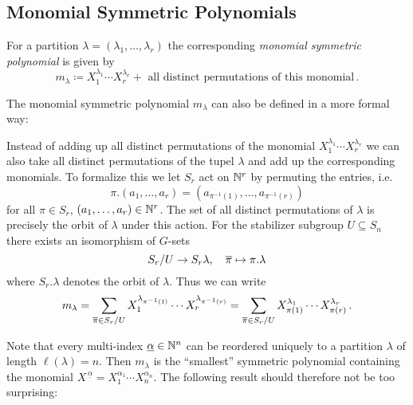 \subsection{Monomial Symmetric Polynomials}

\begin{definition}
  For a partition $\lambda = (\lambda_1, \dotsc, \lambda_r)$ the corresponding \emph{monomial symmetric polynomial} is given by
  \[
              m_\lambda
    \coloneqq   X_1^{\lambda_1} \dotsm X_r^{\lambda_r}
              + \text{ all distinct permutations of this monomial} \,.
  \]
\end{definition}


\begin{remark}
  The monomial symmetric polynomial $m_\lambda$ can also be defined in a more formal way:
  
  Instead of adding up all distinct permutations of the monomial $X_1^{\lambda_1} \dotsm X_r^{\lambda_r}$ we can also take all distinct permutations of the tupel $\lambda$ and add up the corresponding monomials.
  To formalize this we let $S_r$ act on $\mathbb{N}^r$ by permuting the entries, i.e.\
  \[
      \pi.(a_1, \dotsc, a_r)
    = ( a_{\pi^{-1}(1)}, \dotsc, a_{\pi^{-1}(r)} )
  \]
  for all $\pi \in S_r$, $(a_1, \dotsc, a_r) \in \mathbb{N}^r$.
  The set of all distinct permutations of $\lambda$ is precisely the orbit of $\lambda$ under this action.
  For the stabilizer subgroup $U \subseteq S_n$ there exists an isomorphism of $G$-sets
  \[
            S_r / U
    \to     S_r \lambda,
    \quad   \overline{\pi}
    \mapsto \pi.\lambda
  \]
  where $S_r.\lambda$ denotes the orbit of $\lambda$.
  Thus we can write
  \[
      m_\lambda
    = \sum_{\overline{\pi} \in S_r/U} X_1^{\lambda_{\pi^{-1}(1)}} \dotsm X_r^{\lambda_{\pi^{-1}(r)}}
    = \sum_{\overline{\pi} \in S_r/U} X_{\pi(1)}^{\lambda_1} \dotsm X_{\pi(r)}^{\lambda_r} \,.
  \]
\end{remark}


\begin{fluff}
  Note that every multi-index $\underline{\alpha} \in \mathbb{N}^n$ can be reordered uniquely to a partition $\lambda$ of length $\ell(\lambda) = n$.
  Then $m_\lambda$ is the “smallest” symmetric polynomial containing the monomial $X^{\,\underline{\alpha}} = X_1^{\alpha_1} \dotsm X_n^{\alpha_n}$.
  The following result should therefore not be too surprising:
\end{fluff}



